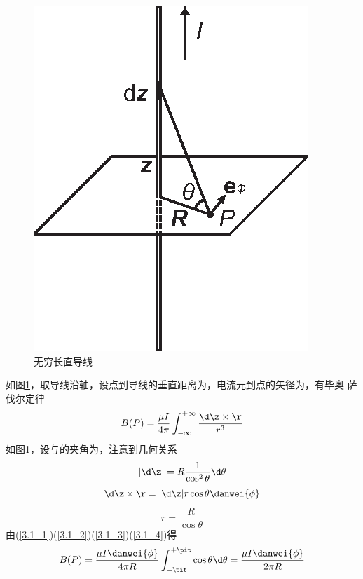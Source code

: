 
    \begin{figure}[htbp]
        \centering
        \includegraphics{img/3.1/导线.eps}
        \caption{无穷长直导线}
        \label{3.1_fig:导线}
    \end{figure}
    
    如图\ref{3.1_fig:导线}，取导线沿轴，设点到导线的垂直距离为，电流元到点的矢径为\nota{\r}，有毕奥-萨伐尔定律
    \begin{equation}
        B(P) = \frac{\mu I}{4\pi}\int_{-\infty}^{+\infty}
        \frac{\d \z\times \r}{r^3}\label{3.1_1}
    \end{equation}
    如图\ref{3.1_fig:导线}，设\nota{\r}与的夹角为\nota{\theta}，注意到几何关系
    \begin{equation}
        |\d \z| = R \frac{1}{\cos^2\theta}\d \theta\label{3.1_2}
    \end{equation}
    \begin{equation}
        \d \z \times \r = |\d \z| r \cos \theta \danwei{\phi}\label{3.1_3}
    \end{equation}
    \begin{equation}
        r = \frac{R}{\cos\theta}\label{3.1_4}
    \end{equation}
    由(\ref{3.1_1})(\ref{3.1_2})(\ref{3.1_3})(\ref{3.1_4})得
    \begin{equation}
        B(P) = \frac{\mu I\danwei{\phi}}{4\pi R}\int_{-\pit}^{+\pit}\cos\theta\d \theta = \frac{\mu I\danwei{\phi}}{2\pi R}\label{3.1_5}
    \end{equation}


